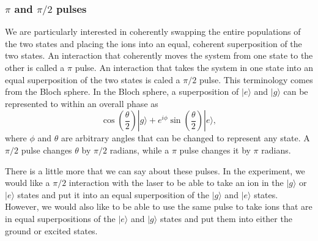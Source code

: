 \subsubsection{$\pi$ and $\pi/2$ pulses}
We are particularly interested in coherently swapping the entire populations of the two states and placing the ions into an equal, coherent superposition of the two states.
An interaction that coherently moves the system from one state to the other is called a $\pi$ pulse. An interaction that takes the system in one state into an equal superposition of the two states is caled a $\pi/2$ pulse. This terminology comes from the Bloch sphere. In the Bloch sphere, a superposition of $|e\rangle$ and $|g\rangle$ can be represented to within an overall phase as 
\begin{equation}
\cos\left(\frac{\theta}{2}\right)|g\rangle+
e^{i\phi}\sin\left(\frac{\theta}{2}\right)|e\rangle,
\end{equation}
where $\phi$ and $\theta$ are arbitrary angles that can be changed to represent any state. A $\pi/2$ pulse changes $\theta$ by $\pi/2$ radians, while a $\pi$ pulse changes it by $\pi$ radians.

There is a little more that we can say about these pulses. In the experiment, we would like a $\pi/2$ interaction with the laser to be able to take an ion in the $|g\rangle$ or $|e\rangle$ states and put it into an equal superposition of the $|g\rangle$ and $|e\rangle$ states. However, we would also like to be able to use the same pulse to take ions that are in equal superpositions of the $|e\rangle$ and $|g\rangle$ states and put them into either the ground or excited states.

